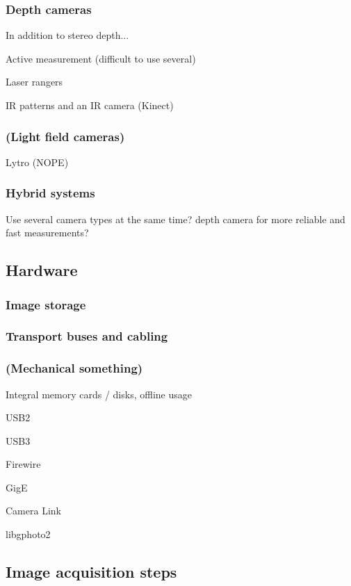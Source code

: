 \subsubsection{Depth cameras}

In addition to stereo depth...

Active measurement (difficult to use several)

Laser rangers

IR patterns and an IR camera (Kinect)

\subsubsection{(Light field cameras)}

Lytro (NOPE)

\subsubsection{Hybrid systems}

Use several camera types at the same time? depth camera for more reliable and fast measurements?


\subsection{Hardware}

\subsubsection{Image storage}

\subsubsection{Transport buses and cabling}

\subsubsection{(Mechanical something)}

Integral memory cards / disks, offline usage

USB2

USB3

Firewire

GigE

Camera Link

libgphoto2

\subsection{Image acquisition steps}

